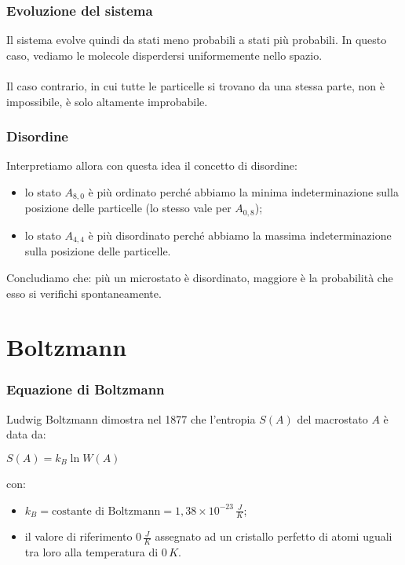 \documentclass[]{beamer}
\theoremstyle{plain}
\begin{document}
\begin{frame}
  \frametitle{Evoluzione del sistema}
  Il sistema evolve quindi \alert<1>{da stati meno probabili a stati più probabili}. In questo caso, vediamo le molecole disperdersi uniformemente nello spazio.\\\pause~\\Il caso contrario, in cui tutte le particelle si trovano da una stessa parte, \alert<2>{non è impossibile}, è solo \alert<2>{altamente improbabile}.
\end{frame}

\begin{frame}
\frametitle{Disordine}
  Interpretiamo allora con questa idea il concetto di \alert<1-2>{disordine}:
  \begin{itemize}
    \item lo stato $ A_{8,0} $ è più ordinato perché abbiamo la minima indeterminazione sulla posizione delle particelle (lo stesso vale per $ A_{0,8} $);\pause
    \item lo stato $ A_{4,4} $ è più disordinato perché abbiamo la massima indeterminazione sulla posizione delle particelle.\pause
  \end{itemize}
  \begin{block}{Concludiamo che:}
    più un microstato è disordinato, maggiore è la probabilità che esso si verifichi spontaneamente.
  \end{block}
\end{frame}

\section{Boltzmann}

\begin{frame}
  \frametitle{Equazione di Boltzmann}
  Ludwig Boltzmann dimostra nel 1877 che l'entropia $ S(A) $ del macrostato $ A $ è data da:
  \begin{center}
\colorbox{blue!30}{$ S(A) = k_B \ln W(A) $}
\end{center}
con:
\begin{itemize}
  \item $ k_B = \text{costante di Boltzmann} = 1,38 \times 10^{-23} \, \frac{J}{K}  $;
  \item il valore di riferimento $ 0 \, \frac{J}{K} $ assegnato ad un cristallo perfetto di atomi uguali tra loro alla temperatura di $ 0 \, K $.
\end{itemize}
\end{frame}
\end{document}
